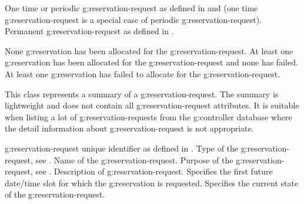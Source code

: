 \begin{Api}
\begin{ApiEnumValues}
 One time or periodic \gls{g:reservation-request} as defined in  and  (one time \gls{g:reservation-request} is a special case of periodic \gls{g:reservation-request}).
 Permanent \gls{g:reservation-request} as defined in .
\end{ApiEnumValues}

\begin{ApiEnumValues}
 None \gls{g:reservation} has been allocated for the \gls{g:reservation-request}.
 At least one \gls{g:reservation} has been allocated for the \gls{g:reservation-request} and none has failed.
 At least one \gls{g:reservation} has failed to allocate for the \gls{g:reservation-request}.
\end{ApiEnumValues}

This class represents a summary of a \gls{g:reservation-request}. The summary is lightweight and does not contain all \gls{g:reservation-request} attributes. It is suitable when listing a lot of \glspl{g:reservation-request} from the \gls{g:controller} database where the detail information about \gls{g:reservation-request} is not appropriate.
\begin{ApiClassAttributes}
 \Gls{g:reservation-request} unique identifier as defined in .
 Type of the \gls{g:reservation-request}, see .
 Name of the \gls{g:reservation-request}.
 Purpose of the \gls{g:reservation-request}, see .
 Description of \gls{g:reservation-request}.
 Specifies the first future date/time slot for which the \gls{g:reservation} is requested.
 Specifies the current state of the \gls{g:reservation-request}. 
\end{ApiClassAttributes}


\end{Api}
